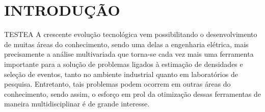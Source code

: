\chapter{INTRODUÇÃO}





\label{cap:intro}
TESTEA
A crescente evolução tecnológica vem possibilitando o desenvolvimento de muitas áreas do conhecimento, sendo uma delas a engenharia elétrica, mais precisamente a análise multivariada \cite{vicini2005analise} que torna-se cada vez mais uma ferramenta importante para a solução de problemas ligados à estimação de densidades e seleção de eventos, tanto no ambiente industrial quanto em laboratórios de pesquisa. Entretanto, tais problemas podem ocorrem em outras áreas do conhecimento, sendo assim, o esforço em prol da otimização dessas ferramentas de maneira multidisciplinar é de grande interesse.

